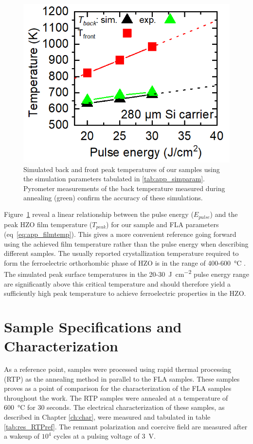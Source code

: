 \documentclass[11pt,twoside]{eitExjobb}
\begin{document}
\begin{figure}[htbp]
    \centering
    \includegraphics[width=.41\linewidth]{fig/img/COMSOLFlashInt.png}
    \caption{Simulated back and front peak temperatures of our samples using the
    simulation parameters tabulated in \ref{tab:app_simparam}. Pyrometer
    measurements of the back temperature measured during annealing (green) confirm
    the accuracy of these simulations.}\label{fig:res_Comsol}
\end{figure}

Figure~\ref{fig:res_Comsol} reveal a linear relationship between the pulse
energy ($E_{pulse}$) and the peak HZO film temperature ($T_{peak}$) for our
sample and FLA parameters (eq~\ref{eq:app_filmtemp}). This gives a more
convenient reference going forward using the achieved film temperature rather
than the pulse energy when describing different samples. The usually reported
crystallization temperature required to form the ferroelectric orthorhombic
phase of HZO is in the range of 400-\SI{600}{\celsius}
\cite{muller2012ferroelectricity, athle2022improved}.
The simulated peak surface temperatures in the
20-\SI{30}{\joule\per\square\centi\meter} pulse energy range are significantly
above this critical temperature and should therefore yield a sufficiently high
peak temperature to achieve ferroelectric properties in the HZO.

\section{Sample Specifications and Characterization}
As a reference point, samples were processed using rapid thermal processing
(RTP) as the annealing method in parallel to the FLA samples. These samples
proves as a point of comparison for the characterization of the FLA samples
throughout the work. The RTP samples were annealed at a temperature of
\SI{600}{\celsius} for 30 seconds. The electrical characterization of these
samples, as described in Chapter \ref{ch:char}, were measured and
tabulated in table \ref{tab:res_RTPref}. The remnant polarization and coercive
field are measured after a wakeup of $10^4$ cycles at a pulsing voltage of
\SI{3}{\volt}.
\end{document}
